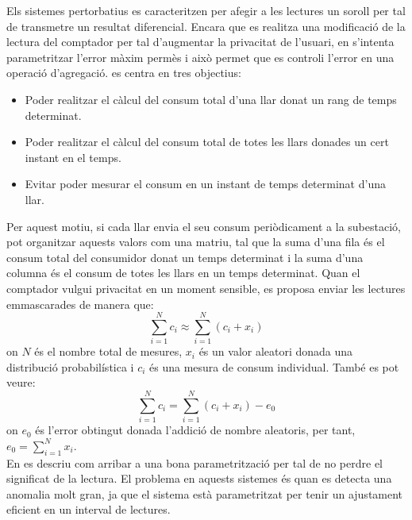 
	
Els sistemes pertorbatius es caracteritzen per afegir a les lectures un soroll per tal de transmetre un resultat diferencial. Encara que es realitza una modificació de la lectura del comptador per tal d'augmentar la privacitat de l'usuari, en \cite{smart-grid-technique} s'intenta parametritzar l'error màxim permès i això permet que es controli l'error en una operació d'agregació. \cite{smart-grid-technique} es centra en tres objectius:
\begin{itemize}
	\item Poder realitzar el càlcul del consum total d'una llar donat un rang de temps determinat.
	\item Poder realitzar el càlcul del consum total de totes les llars donades un cert instant en el temps.
	\item Evitar poder mesurar el consum en un instant de temps determinat d'una llar.
\end{itemize}
Per aquest motiu, si cada llar envia el seu consum periòdicament a la subestació, pot organitzar aquests valors com una matriu, tal que la suma d'una fila és el consum total del consumidor donat un temps determinat i la suma d'una columna és el consum de totes les llars en un temps determinat. Quan el comptador vulgui privacitat en un moment sensible, es proposa enviar les lectures emmascarades de manera que:
\[\sum_{i=1}^{N} c_i \approx \sum_{i=1}^{N} (c_i + x_i)\]
on $N$ és el nombre total de mesures, $x_i$ és un valor aleatori donada una distribució probabilística i $c_i$ és una mesura de consum individual. També es pot veure:
\[\sum_{i=1}^{N} c_i = \sum_{i=1}^{N} (c_i + x_i) - e_0\]
on $e_0$ és l'error obtingut donada l'addició de nombre aleatoris, per tant, $e_0 = \sum_{i=1}^{N}x_i$.\\
En \cite{smart-grid-technique} es descriu com arribar a una bona parametrització per tal de no perdre el significat de la lectura. El problema en aquests sistemes és quan es detecta una anomalia molt gran, ja que el sistema està parametritzat per tenir un ajustament eficient en un interval de lectures.
